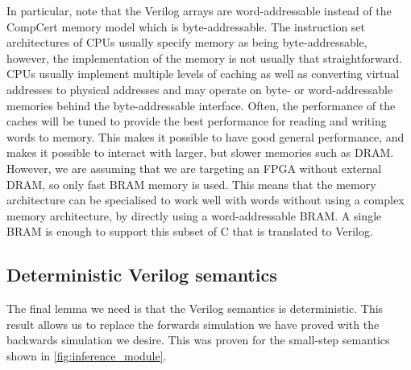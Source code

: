 In particular, note that the Verilog arrays are word-addressable instead of the
CompCert memory model which is byte-addressable.  The instruction set
architectures of \glspl{CPU} usually specify memory as being byte-addressable,
however, the implementation of the memory is not usually that straightforward.
\Glspl{CPU} usually implement multiple levels of caching as well as converting
virtual addresses to physical addresses and may operate on byte- or
word-addressable memories behind the byte-addressable interface.  Often, the
performance of the caches will be tuned to provide the best performance for
reading and writing words to memory.  This makes it possible to have good
general performance, and makes it possible to interact with larger, but slower
memories such as \gls{DRAM}.  However, we are assuming that we are targeting an
\gls{FPGA} without external \gls{DRAM}, so only fast \gls{BRAM} memory is used.
This means that the memory architecture can be specialised to work well with
words without using a complex memory architecture, by directly using a
word-addressable \gls{BRAM}.  A single \gls{BRAM} is enough to support this
subset of C that is translated to Verilog.


\subsection{Deterministic Verilog semantics}%
\label{sec:proof:deterministic}

The final lemma we need is that the Verilog semantics is deterministic. This
result allows us to replace the forwards simulation we have proved with the
backwards simulation we desire.  This was proven for the small-step semantics
shown in \cref{fig:inference_module}.

